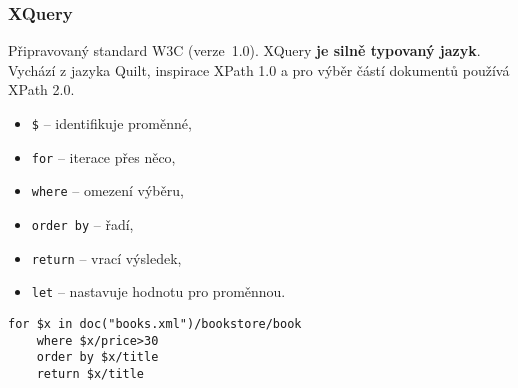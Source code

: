 \subsubsection{XQuery}
Připravovaný standard W3C (verze 1.0). XQuery \textbf{je silně typovaný jazyk}. Vychází z jazyka Quilt, inspirace XPath 1.0 a pro výběr částí dokumentů používá XPath 2.0.
\bigskip\\
\begin{minipage}[t]{0.5\textwidth}
	\begin{itemize}
		\item \texttt{\$} -- identifikuje proměnné,
		\item \texttt{for} -- iterace přes něco,
		\item \texttt{where} -- omezení výběru,
		\item \texttt{order by} -- řadí,
		\item \texttt{return} -- vrací výsledek,
		\item \texttt{let} -- nastavuje hodnotu pro proměnnou.
	\end{itemize}
\end{minipage}
\begin{minipage}[t]{0.5\textwidth}
	\begin{verbatim}
for $x in doc("books.xml")/bookstore/book
	where $x/price>30
	order by $x/title
	return $x/title
	\end{verbatim}
\end{minipage}
